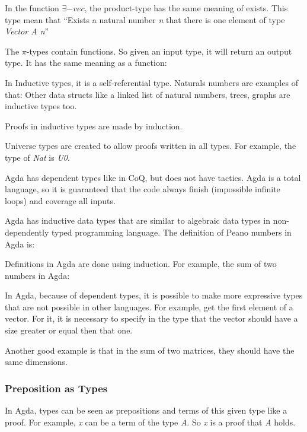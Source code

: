     In the function $\exists-vec$, the product-type has the same meaning of exists.
    This type mean that
    ``Exists a natural number \emph{n} that there is one element of type \emph{Vector A n}''

    The $\pi$-types contain functions.
    So given an input type, it will return an output type.
    It has the same meaning as a function:

    In Inductive types, it is a self-referential type.
    Naturals numbers are examples of that:
    Other data structs like a linked list of natural numbers, trees, graphs are inductive types too.

    Proofs in inductive types are made by induction.

    Universe types are created to allow proofs written in all types.
    For example, the type of \emph{Nat} is \emph{U0}.


Agda has dependent types like in CoQ, but does not have tactics.
Agda is a total language, so it is guaranteed that the code always finish
(impossible infinite loops) and coverage all inputs.

Agda has inductive data types that are similar to algebraic data types in non-dependently
typed programming language.
The definition of Peano numbers in Agda is:


Definitions in Agda are done using induction.
For example, the sum of two numbers in Agda:


In Agda, because of dependent types, it is possible to make more expressive types that are not
possible in other languages.
For example, get the first element of a vector.
For it, it is necessary to specify in the type that the vector should have a size greater or equal
then that one.


Another good example is that in the sum of two matrices, they should have the same dimensions.


\subsubsection{Preposition as Types}

In Agda, types can be seen as prepositions and terms of this given type like a proof.
For example, \emph{x} can be a term of the type \emph{A}.
So \emph{x} is a proof that \emph{A} holds.

